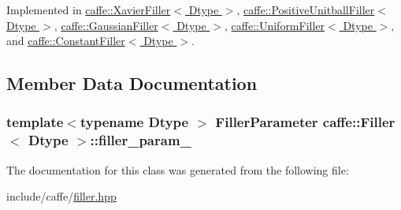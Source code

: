Implemented in \hyperlink{classcaffe_1_1_xavier_filler_af61c37b2a24ebc70c9e7d2d3d703d2c8}{caffe\+::\+Xavier\+Filler$<$ Dtype $>$}, \hyperlink{classcaffe_1_1_positive_unitball_filler_a8ace4f586a5aa3eab7de1dd796556f42}{caffe\+::\+Positive\+Unitball\+Filler$<$ Dtype $>$}, \hyperlink{classcaffe_1_1_gaussian_filler_ac45d5d0695521d7d71a4d5bccb659f21}{caffe\+::\+Gaussian\+Filler$<$ Dtype $>$}, \hyperlink{classcaffe_1_1_uniform_filler_ae874946013d1b9ec4ede19786da34a9d}{caffe\+::\+Uniform\+Filler$<$ Dtype $>$}, and \hyperlink{classcaffe_1_1_constant_filler_a411cf44b177109c388c0b34c906f4e8e}{caffe\+::\+Constant\+Filler$<$ Dtype $>$}.



\subsection{Member Data Documentation}
\hypertarget{classcaffe_1_1_filler_a1ded14cf43eeb7b45628770842c4348c}{
\subsubsection[{filler\+\_\+param\+\_\+}]{\setlength{\rightskip}{0pt plus 5cm}template$<$typename Dtype $>$ Filler\+Parameter {\bf caffe\+::\+Filler}$<$ Dtype $>$\+::filler\+\_\+param\+\_\+\hspace{0.3cm}{\ttfamily [protected]}}}\label{classcaffe_1_1_filler_a1ded14cf43eeb7b45628770842c4348c}


The documentation for this class was generated from the following file\+:\begin{DoxyCompactItemize}
\item 
include/caffe/\hyperlink{filler_8hpp}{filler.\+hpp}\end{DoxyCompactItemize}
